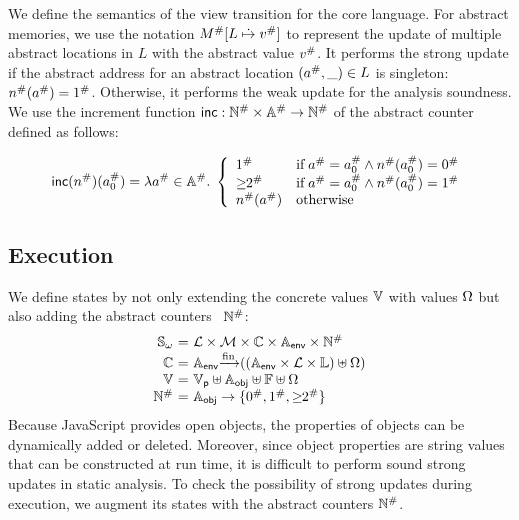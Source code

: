 We define the semantics of the view transition for the core language.  For abstract
memories, we use the notation ${M}^{\#}[L \;\dot{\mapsto}\; {v}^{\#}]$ to represent the
update of multiple abstract locations in $L$ with the abstract value ${v}^{\#}$.
It performs the strong update if the abstract address for an abstract location
$({a}^{\#}, \_) \in L$ is singleton: ${n}^{\#}({a}^{\#}) = {1}^{\#}$.
Otherwise, it performs the weak update for the analysis soundness.  We use
the increment function $\textsf{inc}: {\mathbb{N}}^{\#} \times {\mathbb{A}}^{\#} \rightarrow
{\mathbb{N}}^{\#}$ of the abstract counter defined as follows:

\[
  \textsf{inc}({n}^{\#})({a}^{\#}_0) = \lambda {a}^{\#} \in {\mathbb{A}}^{\#}. \; \left\{
    \begin{array}{ll}
      {1}^{\#} & \text{if} \; {a}^{\#} = {a}^{\#}_0 \wedge
      {n}^{\#}({a}^{\#}_0) = {0}^{\#}\\
      {\geq\!\!2}^{\#} & \text{if} \; {a}^{\#} = {a}^{\#}_0 \wedge
      {n}^{\#}({a}^{\#}_0) = {1}^{\#}\\
      {n}^{\#}({a}^{\#}) & \text{otherwise}
    \end{array}
  \right.
\]


\subsection{{\SealeD} Execution}

We define {\sealed} states by not only extending the concrete values
$\mathbb{V}$ with {\sealed} values $\Omega$ but also adding the abstract counters~
${\mathbb{N}}^{\#}$:
\[
  \begin{array}{r@{~}c@{~}l}
    \symbstset &=& \labset \times \memset \times \ctxtset \times \eaddrset
    \times \abscountset\\
    \ctxtset &=& \eaddrset \finmap ((\eaddrset \times \labset \times \locset)
    \uplus \symbset)\\
    \valset &=& \pvalset \uplus \oaddrset \uplus \fvalset \uplus \symbset\\
    \abscountset &=& \oaddrset \rightarrow \{ \abszero, \absone, \absmany \}\\
  \end{array}
\]
Because JavaScript provides open objects, the properties of objects can be dynamically added or deleted.
Moreover, since object properties are string values that can be constructed at run time,
it is difficult to perform sound strong updates in static analysis.
To check the possibility of strong updates during {\sealed} execution,
we augment its states with the abstract counters ${\mathbb{N}}^{\#}$.

